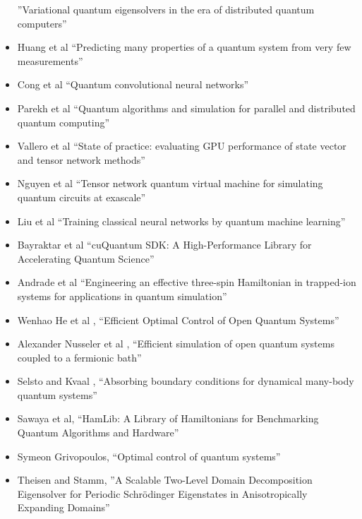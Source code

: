 \documentclass[]{article}
\begin{document}
\begin{itemize}
''Variational quantum eigensolvers in the era of distributed quantum computers''
\item Huang et al\cite{huang2020predicting}
``Predicting many properties of a quantum system from very few measurements''
\item Cong et al\cite{cong2019quantum}
``Quantum convolutional neural networks''
\item Parekh et al\cite{parekh2021quantum}
``Quantum algorithms and simulation for parallel and distributed quantum computing''
\item Vallero et al\cite{vallero2024state}
``State of practice: evaluating GPU performance of state vector and tensor network methods''
\item Nguyen et al\cite{nguyen2022tensor}
``Tensor network quantum virtual machine for simulating quantum circuits at exascale''
\item Liu et al\cite{liu2024training}
``Training classical neural networks by quantum machine learning''
\item Bayraktar et al\cite{10313722}
``cuQuantum SDK: A High-Performance Library for Accelerating Quantum Science''
\item Andrade et al\cite{Andrade_2022}
``Engineering an effective three-spin Hamiltonian in trapped-ion systems for applications in quantum simulation''
\item Wenhao He et al
 \cite{he2024efficientoptimalcontrolopen},
 ``Efficient Optimal Control of Open Quantum Systems''
\item Alexander Nusseler et al
\cite{PhysRevB.101.155134},
``Efficient simulation of open quantum systems coupled to a fermionic bath''
\item Selsto and Kvaal
\cite{Selsto2010},
``Absorbing boundary conditions for dynamical many-body quantum systems''
\item Sawaya et al\cite{10313872},
  ``HamLib: A Library of Hamiltonians for Benchmarking Quantum Algorithms and Hardware''
\item Symeon Grivopoulos\cite{grivopoulos2005optimal},
 ``Optimal control of quantum systems''
 \item Theisen and Stamm\cite{doi:10.1137/23M161848X},
  ''A Scalable Two-Level Domain Decomposition Eigensolver for Periodic Schrödinger Eigenstates in Anisotropically Expanding Domains''
\end{itemize}
\end{document}
